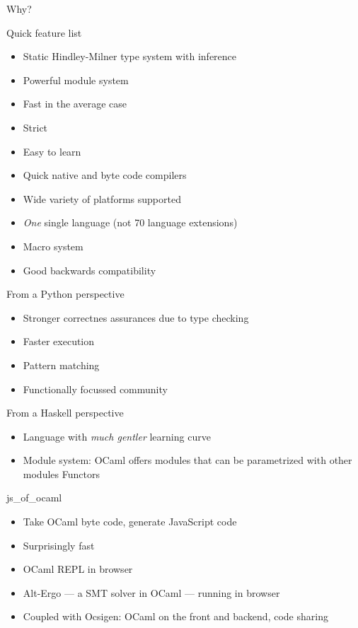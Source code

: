 \documentclass{beamer}
\begin{document}
\begin{frame}{}
  \center
  \fontsize{70}{70} \exclaim Why?
\end{frame}

\begin{frame}{Quick feature list}
  \begin{itemize}
    \item Static Hindley-Milner type system with inference
    \item Powerful module system
    \item Fast in the average case
    \item Strict
    \item Easy to learn
    \item Quick native and byte code compilers
    \item Wide variety of platforms supported
    \item \emph{One} single language (not 70 language extensions)
    \item Macro system
    \item Good backwards compatibility
  \end{itemize}
\end{frame}

\begin{frame}{From a Python perspective}
  \begin{itemize}
    \item Stronger correctnes assurances due to type checking
    \item Faster execution
    \item Pattern matching
    \item Functionally focussed community
  \end{itemize}
\end{frame}

\begin{frame}{From a Haskell perspective}
  \begin{itemize}
    \item Language with \emph{much gentler} learning curve
    \item Module system: OCaml offers modules that can be parametrized
      with other modules \rightarrow Functors
  \end{itemize}
\end{frame}

\begin{frame}{js\_of\_ocaml}
  \begin{itemize}
    \item Take OCaml byte code, generate JavaScript code
    \item Surprisingly fast
    \item OCaml REPL in browser
    \item Alt-Ergo — a SMT solver in OCaml — running in browser
    \item Coupled with Ocsigen: OCaml on the front and backend, code sharing
  \end{itemize}
\end{frame}
\end{document}
